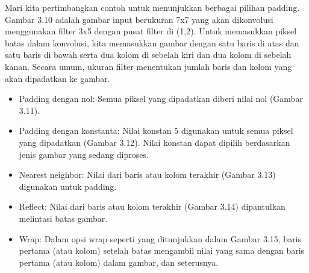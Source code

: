 \documentclass[
  letterpaper,
  DIV=11,
  numbers=noendperiod]{scrreprt}
\providecommand{\tightlist}{%
  \setlength{\itemsep}{0pt}\setlength{\parskip}{0pt}}\usepackage{longtable,booktabs,array}
\begin{document}
Mari kita pertimbangkan contoh untuk menunjukkan berbagai pilihan
padding. Gambar 3.10 adalah gambar input berukuran 7x7 yang akan
dikonvolusi menggunakan filter 3x5 dengan pusat filter di (1,2). Untuk
memasukkan piksel batas dalam konvolusi, kita memasukkan gambar dengan
satu baris di atas dan satu baris di bawah serta dua kolom di sebelah
kiri dan dua kolom di sebelah kanan. Secara umum, ukuran filter
menentukan jumlah baris dan kolom yang akan dipadatkan ke gambar.

\begin{itemize}
\tightlist
\item
  Padding dengan nol: Semua piksel yang dipadatkan diberi nilai nol
  (Gambar 3.11).
\item
  Padding dengan konstanta: Nilai konstan 5 digunakan untuk semua piksel
  yang dipadatkan (Gambar 3.12). Nilai konstan dapat dipilih berdasarkan
  jenis gambar yang sedang diproses.
\item
  Nearest neighbor: Nilai dari baris atau kolom terakhir (Gambar 3.13)
  digunakan untuk padding.
\item
  Reflect: Nilai dari baris atau kolom terakhir (Gambar 3.14)
  dipantulkan melintasi batas gambar.
\item
  Wrap: Dalam opsi wrap seperti yang ditunjukkan dalam Gambar 3.15,
  baris pertama (atau kolom) setelah batas mengambil nilai yang sama
  dengan baris pertama (atau kolom) dalam gambar, dan seterusnya.
\end{itemize}
\end{document}
